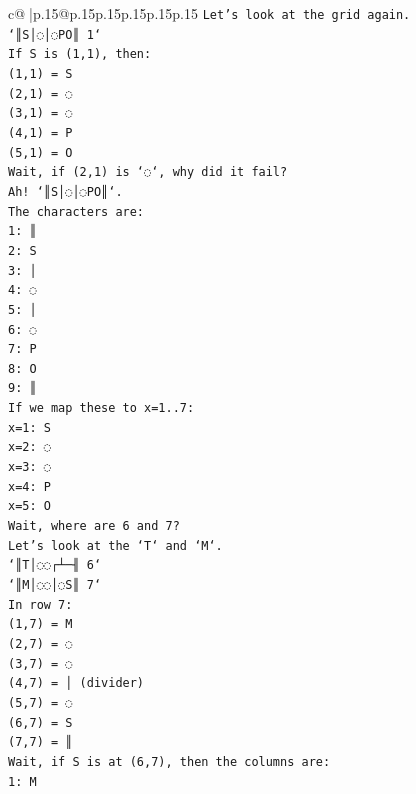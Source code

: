 \documentclass{article}
\begin{document}
{\begin{supertabular}{c@{$\;$}|p{.15\linewidth}@{}p{.15\linewidth}p{.15\linewidth}p{.15\linewidth}p{.15\linewidth}p{.15\linewidth}}
{{{\texttt{Let's look at the grid again.} \\
\texttt{`║S│◌│◌PO║ 1`} \\
\texttt{If S is (1,1), then:} \\
\texttt{(1,1) = S} \\
\texttt{(2,1) = ◌} \\
\texttt{(3,1) = ◌} \\
\texttt{(4,1) = P} \\
\texttt{(5,1) = O} \\
\texttt{Wait, if (2,1) is `◌`, why did it fail?} \\
\texttt{Ah! `║S│◌│◌PO║`.} \\
\texttt{The characters are:} \\
\texttt{1: ║} \\
\texttt{2: S} \\
\texttt{3: │} \\
\texttt{4: ◌} \\
\texttt{5: │} \\
\texttt{6: ◌} \\
\texttt{7: P} \\
\texttt{8: O} \\
\texttt{9: ║} \\
\texttt{If we map these to x=1..7:} \\
\texttt{x=1: S} \\
\texttt{x=2: ◌} \\
\texttt{x=3: ◌} \\
\texttt{x=4: P} \\
\texttt{x=5: O} \\
\texttt{Wait, where are 6 and 7?} \\
\texttt{Let's look at the `T` and `M`.} \\
\texttt{`║T│◌◌┌┴─╢ 6`} \\
\texttt{`║M│◌◌│◌S║ 7`} \\
\texttt{In row 7:} \\
\texttt{(1,7) = M} \\
\texttt{(2,7) = ◌} \\
\texttt{(3,7) = ◌} \\
\texttt{(4,7) = │ (divider)} \\
\texttt{(5,7) = ◌} \\
\texttt{(6,7) = S} \\
\texttt{(7,7) = ║} \\
\texttt{Wait, if S is at (6,7), then the columns are:} \\
\texttt{1: M} \\
}}}
\end{supertabular}}
\end{document}
